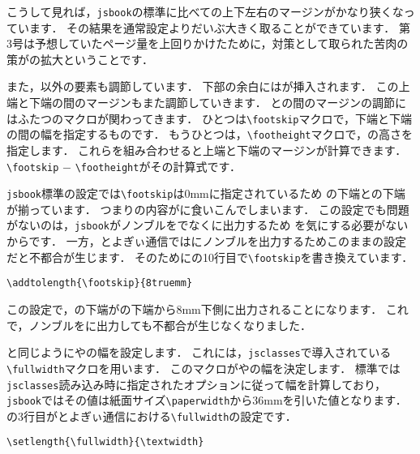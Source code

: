 こうして見れば，\verb|jsbook|の標準に比べての上下左右のマージンがかなり狭くなっています．
その結果を通常設定よりだいぶ大きく取ることができています．
第3号は予想していたページ量を上回りかけたために，対策として取られた苦肉の策がの拡大ということです．

また，以外の要素も調節しています．
下部の余白にはが挿入されます．
この上端と下端の間のマージンもまた調節していきます．
との間のマージンの調節にはふたつのマクロが関わってきます．
ひとつは\verb|\footskip|マクロで，下端と下端の間の幅を指定するものです．
もうひとつは，\verb|\footheight|マクロで，の高さを指定します．
これらを組み合わせると上端と下端のマージンが計算できます．
\verb|\footskip| $-$ \verb|\footheight|がその計算式です．

\texttt{jsbook}標準の設定では\verb|\footskip|は0mmに指定されているため
の下端との下端が揃っています．
つまりの内容がに食いこんでしまいます．
この設定でも問題がないのは，\texttt{jsbook}がノンブルをでなくに出力するため
を気にする必要がないからです．
一方，とよぎぃ通信ではにノンブルを出力するためこのままの設定だと不都合が生じます．
そのためにの10行目で\verb|\footskip|を書き換えています．
\begin{verbatim}
\addtolength{\footskip}{8truemm}
\end{verbatim}

この設定で，の下端がの下端から8mm下側に出力されることになります．
これで，ノンブルをに出力しても不都合が生じなくなりました．

と同じようにやの幅を設定します．
これには，\texttt{jsclasses}で導入されている\verb|\fullwidth|マクロを用います．
このマクロがやの幅を決定します．
標準では\texttt{jsclasses}読み込み時に指定されたオプションに従って幅を計算しており，
\texttt{jsbook}ではその値は紙面サイズ\verb|\paperwidth|から36mmを引いた値となります．
の3行目がとよぎぃ通信における\verb|\fullwidth|の設定です．
\begin{verbatim}
\setlength{\fullwidth}{\textwidth}
\end{verbatim}

